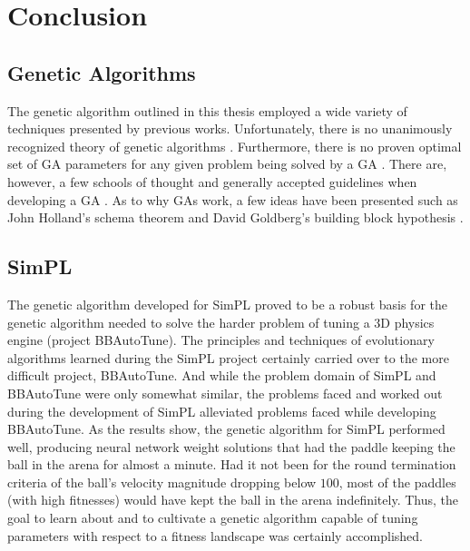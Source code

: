\chapter{Conclusion}

\label{Chapter6}


\section{Genetic Algorithms}

The genetic algorithm outlined in this thesis employed a wide variety of techniques presented by previous works. Unfortunately, there is no unanimously recognized theory of genetic algorithms \cite{Beasley93anoverview}. Furthermore, there is no proven optimal set of GA parameters for any given problem being solved by a GA \cite{ColinReeves}. There are, however, a few schools of thought and generally accepted guidelines when developing a GA \cite{ColinReeves}\cite{Beasley93anoverview}. As to why GAs work, a few ideas have been presented such as John Holland's schema theorem and David Goldberg's building block hypothesis \cite{Beasley93anoverview}.         

\section{SimPL}


The genetic algorithm developed for SimPL proved to be a robust basis for the genetic algorithm needed to solve the harder problem of tuning a 3D physics engine (project BBAutoTune). The principles and techniques of evolutionary algorithms learned during the SimPL project certainly carried over to the more difficult project, BBAutoTune. And while the problem domain of SimPL and BBAutoTune were only somewhat similar, the problems faced and worked out during the development of SimPL alleviated problems faced while developing BBAutoTune. As the results show, the genetic algorithm for SimPL performed well, producing neural network weight solutions that had the paddle keeping the ball in the arena for almost a minute. Had it not been for the round termination criteria of the ball's velocity magnitude dropping below $100$, most of the paddles (with high fitnesses) would have kept the ball in the arena indefinitely. Thus, the goal to learn about and to cultivate a genetic algorithm capable of tuning parameters with respect to a fitness landscape was certainly accomplished. 

